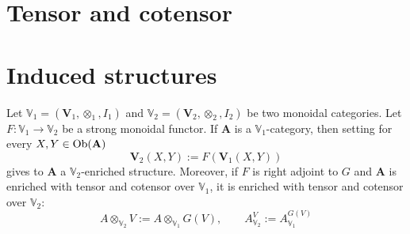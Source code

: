 \begin{refsection}
\section{Tensor and cotensor}


\section{Induced structures}

\begin{thm} \label{thm induced structure}
Let $\mathbb V_1 = (\mathbf V_1, \otimes_1, I_1)$ and $\mathbb V_2 = (\mathbf V_2, \otimes_2, I_2)$ be two monoidal categories. Let $F \colon \mathbb V_1 \to \mathbb V_2$ be a strong monoidal functor. If $\mathbf A$ is a $\mathbb V_1$-category, then setting for every $X,Y \in \operatorname{Ob}(\mathbf A)$
\[
\mathbf V_2(X,Y) := F(\mathbf V_1(X,Y))
\]
gives to $\mathbf A$ a $\mathbb V_2$-enriched structure. Moreover, if $F$ is right adjoint to $G$ and $\mathbf A$ is enriched with tensor and cotensor over $\mathbb V_1$, it is enriched with tensor and cotensor over $\mathbb V_2$:
\[
A \otimes_{\mathbb V_2} V := A \otimes_{\mathbb V_1} G(V), \qquad A^{V}_{\mathbb V_2} := A^{G(V)}_{\mathbb V_1}
\]
\end{thm}

\printbibliography[heading = local]

\end{refsection}
